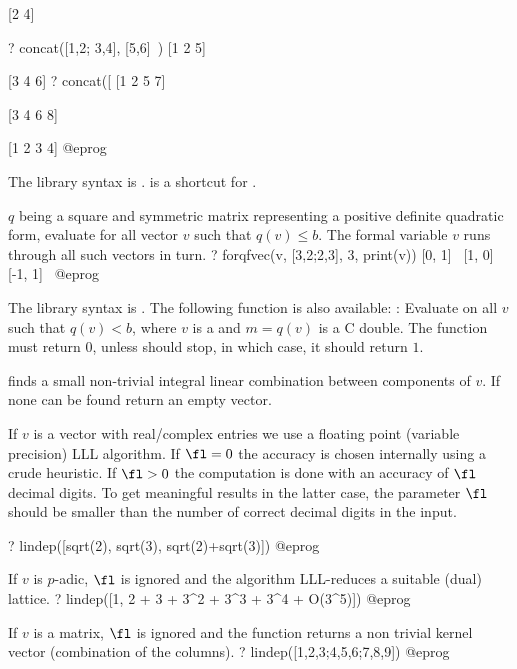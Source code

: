 [2 4]

? concat([1,2; 3,4], [5,6]~)
[1 2 5]

[3 4 6]
? concat([%
[1 2 5 7]

[3 4 6 8]

[1 2 3 4]
@eprog

The library syntax is .
 is a shortcut for .

\label{se:forqfvec}
$q$ being a square and symmetric matrix representing a positive definite
quadratic form, evaluate  for all vector $v$ such that $q(v)\leq b$.
The formal variable $v$ runs through all such vectors in turn.
\bprog
? forqfvec(v, [3,2;2,3], 3, print(v))
[0, 1]~
[1, 0]~
[-1, 1]~
@eprog

The library syntax is .
The following function is also available:
:
Evaluate  on all $v$ such that $q(v)<b$, where $v$ is a
 and $m=q(v)$ is a C double. The function  must
return $0$, unless  should stop, in which case, it should
return $1$.

\label{se:lindep}
 finds a small non-trivial integral linear
combination between components of $v$. If none can be found return an empty
vector.

If $v$ is a vector with real/complex entries we use a floating point
(variable precision) LLL algorithm. If $\fl = 0$ the accuracy is chosen
internally using a crude heuristic. If $\fl > 0$ the computation is done with
an accuracy of $\fl$ decimal digits. To get meaningful results in the latter
case, the parameter $\fl$ should be smaller than the number of correct
decimal digits in the input.

\bprog
? lindep([sqrt(2), sqrt(3), sqrt(2)+sqrt(3)])
@eprog

If $v$ is $p$-adic, $\fl$ is ignored and the algorithm LLL-reduces a
suitable (dual) lattice.
\bprog
? lindep([1, 2 + 3 + 3^2 + 3^3 + 3^4 + O(3^5)])
@eprog

If $v$ is a matrix, $\fl$ is ignored and the function returns a non trivial
kernel vector (combination of the columns).
\bprog
? lindep([1,2,3;4,5,6;7,8,9])
@eprog

